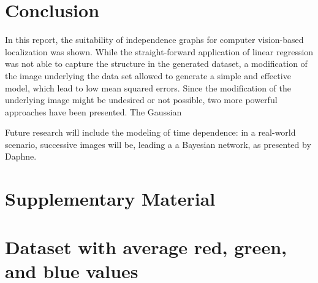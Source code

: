 \documentclass{article}
\begin{document}
\section{Conclusion}

In this report, the suitability of independence graphs for computer
vision-based localization was shown. While the straight-forward
application of linear regression was not able to capture the structure
in the generated dataset, a modification of the image underlying the
data set allowed to generate a simple and effective model, which lead
to low mean squared errors. Since the
modification of the underlying image might be undesired or not
possible, two more powerful approaches have been presented. The
Gaussian 

Future research will include the modeling of time dependence: in a
real-world scenario, successive images will be, leading a a Bayesian
network, as presented by Daphne.


\appendix

\section{Supplementary Material}

\section{Dataset with average red, green, and blue values}
\begin{center}
\end{center}
\end{document}
